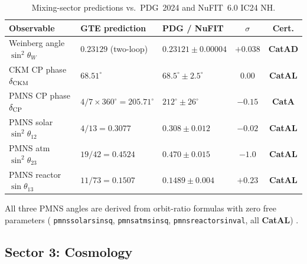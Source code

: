 \documentclass[11pt,a4paper]{article}
\newcommand{\lean}[1]{%
  \penalty-100
  \begingroup\def\_{\textunderscore\allowbreak}\texttt{#1}\endgroup}
\newcommand{\CatAL}{\textbf{CatAL}}
\newcommand{\CatAD}{\textbf{CatAD}}
\newcommand{\CatA}{\textbf{CatA}}
\newcommand{\sigW}{\sin^2\!\theta_W}
\begin{document}
\begin{table}[htbp]
\centering
\caption{Mixing-sector predictions vs.\ PDG~2024 and NuFIT~6.0 IC24 NH.}
\label{tab:mixing}
\setlength{\tabcolsep}{4pt}
\begin{tabular}{lllcc}
\toprule
Observable & GTE prediction & PDG / NuFIT & $\sigma$ & Cert. \\
\midrule
Weinberg angle $\sigW$ & $0.23129$ (two-loop) & $0.23121 \pm 0.00004$ & $+0.038$ & \CatAD \\
CKM CP phase $\delta_{\rm CKM}$ & $68.51^\circ$ & $68.5^\circ \pm 2.5^\circ$ & $0.00$ & \CatAL \\
PMNS CP phase $\delta_{\rm CP}$ & $4/7 \times 360^\circ = 205.71^\circ$ & $212^\circ \pm 26^\circ$ & $-0.15$ & \CatA \\
PMNS solar $\sin^2\!\theta_{12}$ & $4/13 = 0.3077$ & $0.308 \pm 0.012$ & $-0.02$ & \CatAL \\
PMNS atm $\sin^2\!\theta_{23}$ & $19/42 = 0.4524$ & $0.470 \pm 0.015$ & $-1.0$ & \CatAL \\
PMNS reactor $\sin\theta_{13}$ & $11/73 = 0.1507$ & $0.1489 \pm 0.004$ & $+0.23$ & \CatAL \\
\bottomrule
\end{tabular}
\end{table}

All three PMNS angles are derived from orbit-ratio formulas with zero free
parameters (\lean{pmns\_solar\_sin\_sq}, \lean{pmns\_atm\_sin\_sq},
\lean{pmns\_reactor\_sin\_val}, all \CatAL) \cite{SpivackGTECompleteFramework}.

\subsection{Sector 3: Cosmology}
\end{document}
